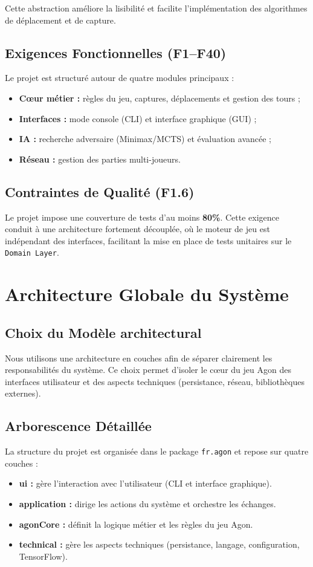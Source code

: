 \documentclass[9pt]{extarticle} %
\begin{document}
Cette abstraction améliore la lisibilité et facilite l’implémentation des algorithmes de déplacement et de capture.

\subsection{Exigences Fonctionnelles (F1--F40)}

Le projet est structuré autour de quatre modules principaux :
\begin{itemize}
    \item \textbf{Cœur métier :} règles du jeu, captures, déplacements et gestion des tours ;
    \item \textbf{Interfaces :} mode console (CLI) et interface graphique (GUI) ;
    \item \textbf{IA :} recherche adversaire (Minimax/MCTS) et évaluation avancée ;
    \item \textbf{Réseau :} gestion des parties multi-joueurs.
\end{itemize}

\subsection{Contraintes de Qualité (F1.6)}

Le projet impose une couverture de tests d’au moins \textbf{80\%}.  
Cette exigence conduit à une architecture fortement découplée, où le moteur de jeu est indépendant des interfaces, facilitant la mise en place de tests unitaires sur le \texttt{Domain Layer}.

\section{Architecture Globale du Système}

\subsection{Choix du Modèle architectural}
Nous utilisons une architecture en couches afin de séparer clairement les responsabilités du système.
Ce choix permet d’isoler le cœur du jeu Agon des interfaces utilisateur et des aspects techniques
(persistance, réseau, bibliothèques externes).


\subsection{Arborescence Détaillée}
La structure du projet est organisée dans le package \texttt{fr.agon} et repose sur quatre couches :
\begin{itemize}
    \item \textbf{ui :} gère l’interaction avec l’utilisateur (CLI et interface graphique).
    \item \textbf{application :} dirige les actions du système et orchestre les échanges.
    \item \textbf{agonCore :} définit la logique métier et les règles du jeu Agon.
    \item \textbf{technical :} gère les aspects techniques (persistance, langage, configuration, TensorFlow).
\end{itemize}
\end{document}
